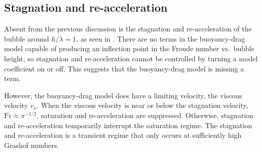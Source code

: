 \subsection{Stagnation and re-acceleration}

Absent from the previous discussion is the stagnation and re-acceleration of the bubble around $h / \lambda = 1$, as seen in .
There are no terms in the buoyancy-drag model capable of producing an inflection point in the Froude number vs.\ bubble height, so stagnation and re-acceleration cannot be controlled by turning a model coefficient on or off.
This suggests that the buoyancy-drag model is missing a term.

However, the buoyancy-drag model does have a limiting velocity, the viscous velocity $v_\nu$.
When the viscous velocity is near or below the stagnation velocity, $\text{Fr} \approx \pi^{-1/2}$, saturation and re-acceleration are suppressed.
Otherwise, stagnation and re-acceleration temporarily interrupt the saturation regime.
The stagnation and re-acceleration is a transient regime that only occurs at sufficiently high Grashof numbers.

